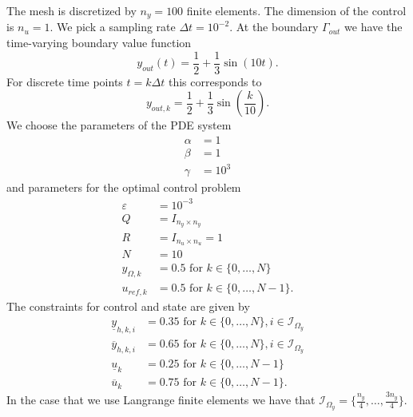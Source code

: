 \documentclass[
12pt, %
a4paper, %
onecolumn, %
portrait %
]{article}
\begin{document}
The mesh is discretized by $n_y = 100$ finite elements. The dimension of the control is $n_u = 1$. We pick a sampling rate $\Delta t = 10^{-2}$. At the boundary $\Gamma_{out}$ we have the time-varying boundary value function 
\begin{equation}
y_{out}(t) = \frac{1}{2} + \frac{1}{3} \sin(10t).
\end{equation}
For discrete time points $t = k \Delta t$ this corresponds to
\begin{equation}
y_{out,k} = \frac{1}{2} + \frac{1}{3} \sin(\frac{k}{10}).
\end{equation}
We choose the parameters of the PDE system
\begin{align*}
\alpha &= 1 \\
\beta &= 1 \\
\gamma &= 10^{3}
\end{align*}
and parameters for the optimal control problem
\begin{align*}
\varepsilon &= 10^{-3} \\
Q &= I_{n_y \times n_y} \\
R &= I_{n_u \times n_u} = 1\\
N &= 10\\
y_{\Omega,k} &= 0.5 \text{ for } k \in \{0, \hdots, N\} \\
u_{ref,k} &= 0.5 \text{ for } k \in \{0, \hdots, N-1\}.
\end{align*}
The constraints for control and state are given by
\begin{align*}
\underline{y}_{h,k,i} &= 0.35  \text{ for } k \in \{0, \hdots, N\}, i \in \mathcal{I}_{\Omega_y}\\
\overline{y}_{h,k,i} &= 0.65  \text{ for } k \in \{0, \hdots, N\}, i \in \mathcal{I}_{\Omega_y}\\
\underline{u}_k &= 0.25 \text{ for } k \in \{0, \hdots, N-1\}\\
\overline{u}_k &= 0.75 \text{ for } k \in \{0, \hdots, N-1\}.
\end{align*}
In the case that we use Langrange finite elements we have that $\mathcal{I}_{\Omega_y} = \{\frac{n_y}{4}, \hdots, \frac{3 n_y}{4}\}$.
\newpage

\renewcommand{\refname}{Reference} %




\end{document}
